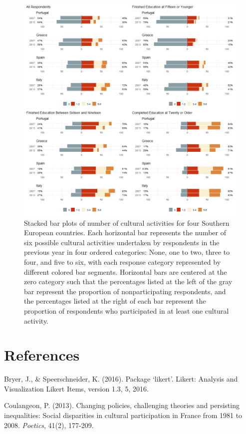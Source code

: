 \documentclass{article}
\begin{document}
\begin{figure}
    \centering
    \includegraphics[width=1.0\textwidth]{Plots/cult-cat-by-year-by-country-combo.png}
    \caption{Stacked bar plots of number of cultural activities for four Southern European countries. Each horizontal bar represents the number of six possible cultural activities undertaken by respondents in the previous year in four ordered categories: None, one to two, three to four, and five to six, with each response category represented by different colored bar segments. Horizontal bars are centered at the zero category such that the percentages listed at the left of the gray bar represent the proportion of nonparticipating respondents, and the percentages listed at the right of each bar represent the proportion of respondents who participated in at least one cultural activity.}
    \label{fig: main}
\end{figure}

\section*{References}
\noindent

Bryer, J., \& Speerschneider, K. (2016). Package ‘likert’. Likert: Analysis and Visualization Likert Items, version 1.3, 5, 2016.

Coulangeon, P. (2013). Changing policies, challenging theories and persisting inequalities: Social disparities in cultural participation in France from 1981 to 2008. \textit{Poetics}, 41(2), 177-209.
\end{document}
